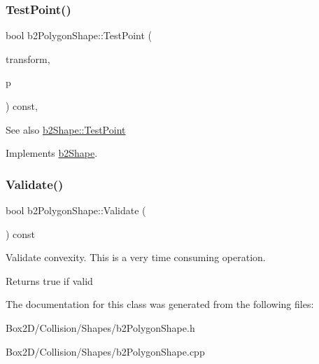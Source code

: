 \subsubsection{\texorpdfstring{Test\+Point()}{TestPoint()}}
{\footnotesize\ttfamily bool b2\+Polygon\+Shape\+::\+Test\+Point (\begin{DoxyParamCaption}\item[{const \hyperlink{structb2_transform}{b2\+Transform} \&}]{transform,  }\item[{const \hyperlink{structb2_vec2}{b2\+Vec2} \&}]{p }\end{DoxyParamCaption}) const\hspace{0.3cm}{\ttfamily [override]}, {\ttfamily [virtual]}}

\begin{DoxySeeAlso}{See also}
\hyperlink{classb2_shape_a6ac968e403e2d93e8ae46d728a2e50fa}{b2\+Shape\+::\+Test\+Point} 
\end{DoxySeeAlso}


Implements \hyperlink{classb2_shape_a6ac968e403e2d93e8ae46d728a2e50fa}{b2\+Shape}.

\mbox{\label{classb2_polygon_shape_a135f4c20e17f10479e08f7befbd4d1f0}} 
\subsubsection{\texorpdfstring{Validate()}{Validate()}}
{\footnotesize\ttfamily bool b2\+Polygon\+Shape\+::\+Validate (\begin{DoxyParamCaption}{ }\end{DoxyParamCaption}) const}

Validate convexity. This is a very time consuming operation. \begin{DoxyReturn}{Returns}
true if valid 
\end{DoxyReturn}


The documentation for this class was generated from the following files\+:\begin{DoxyCompactItemize}
\item 
Box2\+D/\+Collision/\+Shapes/b2\+Polygon\+Shape.\+h\item 
Box2\+D/\+Collision/\+Shapes/b2\+Polygon\+Shape.\+cpp\end{DoxyCompactItemize}

